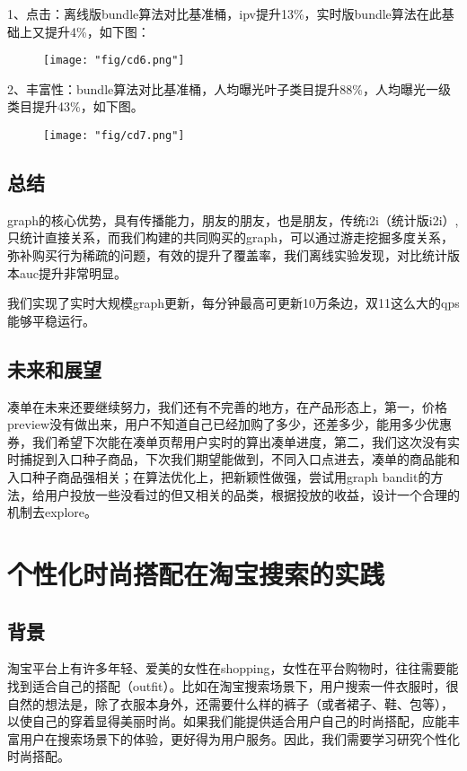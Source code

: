 1、点击：离线版bundle算法对比基准桶，ipv提升13\%，实时版bundle算法在此基础上又提升4\%，如下图：

\begin{figure}[!h]
	\centering
	\texttt{[image: "fig/cd6.png"]}
	\caption{}
	\label{fig:cd6}
\end{figure}

2、丰富性：bundle算法对比基准桶，人均曝光叶子类目提升88\%，人均曝光一级类目提升43\%，如下图。

\begin{figure}[!h]
	\centering
	\texttt{[image: "fig/cd7.png"]}
	\caption{}
	\label{fig:cd7}
\end{figure}


\subsection{总结}
graph的核心优势，具有传播能力，朋友的朋友，也是朋友，传统i2i（统计版i2i）,只统计直接关系，而我们构建的共同购买的graph，可以通过游走挖掘多度关系，弥补购买行为稀疏的问题，有效的提升了覆盖率，我们离线实验发现，对比统计版本auc提升非常明显。
\par 我们实现了实时大规模graph更新，每分钟最高可更新10万条边，双11这么大的qps能够平稳运行。
	

\subsection{未来和展望}
凑单在未来还要继续努力，我们还有不完善的地方，在产品形态上，第一，价格preview没有做出来，用户不知道自己已经加购了多少，还差多少，能用多少优惠券，我们希望下次能在凑单页帮用户实时的算出凑单进度，第二，我们这次没有实时捕捉到入口种子商品，下次我们期望能做到，不同入口点进去，凑单的商品能和入口种子商品强相关；在算法优化上，把新颖性做强，尝试用graph bandit的方法，给用户投放一些没看过的但又相关的品类，根据投放的收益，设计一个合理的机制去explore。



\section{个性化时尚搭配在淘宝搜索的实践}

\subsection{背景}
淘宝平台上有许多年轻、爱美的女性在shopping，女性在平台购物时，往往需要能找到适合自己的搭配（outfit）。比如在淘宝搜索场景下，用户搜索一件衣服时，很自然的想法是，除了衣服本身外，还需要什么样的裤子（或者裙子、鞋、包等），以使自己的穿着显得美丽时尚。如果我们能提供适合用户自己的时尚搭配，应能丰富用户在搜索场景下的体验，更好得为用户服务。因此，我们需要学习研究个性化时尚搭配。

